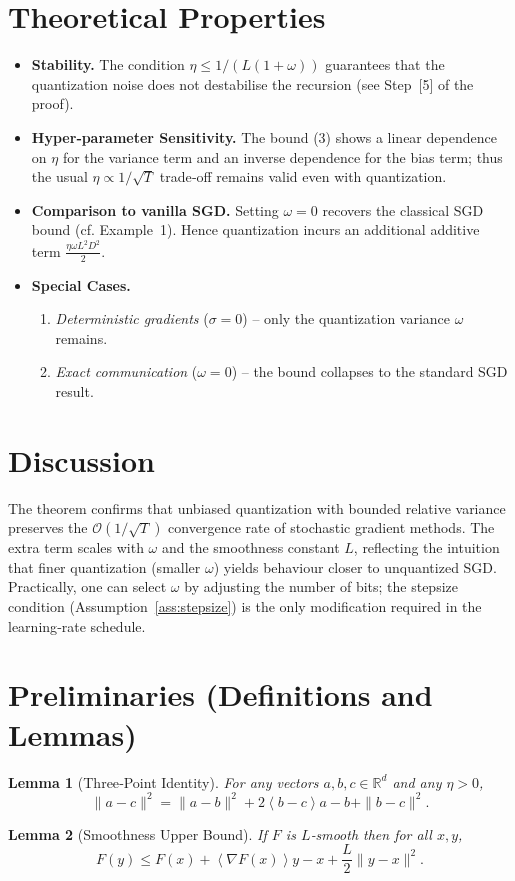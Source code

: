 \documentclass{article}
\newtheorem{lemma}{Lemma}
\newcommand{\RR}{\mathbb{R}}
\newcommand{\inner}[1]{\left\langle #1 \right\rangle}
\begin{document}
\section*{Theoretical Properties}
\begin{itemize}
\item \textbf{Stability.} The condition $\eta\le 1/(L(1+\omega))$ guarantees that the quantization noise does not destabilise the recursion (see Step~[5] of the proof).
\item \textbf{Hyper‑parameter Sensitivity.} The bound (3) shows a linear dependence on $\eta$ for the variance term and an inverse dependence for the bias term; thus the usual $\eta\propto 1/\sqrt{T}$ trade‑off remains valid even with quantization.
\item \textbf{Comparison to vanilla SGD.} Setting $\omega=0$ recovers the classical SGD bound (cf. Example 1). Hence quantization incurs an additional additive term $\frac{\eta\omega L^{2}D^{2}}{2}$.
\item \textbf{Special Cases.}
\begin{enumerate}
\item \emph{Deterministic gradients} ($\sigma=0$) – only the quantization variance $\omega$ remains.
\item \emph{Exact communication} ($\omega=0$) – the bound collapses to the standard SGD result.
\end{enumerate}
\end{itemize}

\section*{Discussion}
The theorem confirms that unbiased quantization with bounded relative variance preserves the $\mathcal{O}(1/\sqrt{T})$ convergence rate of stochastic gradient methods. The extra term scales with $\omega$ and the smoothness constant $L$, reflecting the intuition that finer quantization (smaller $\omega$) yields behaviour closer to unquantized SGD. Practically, one can select $\omega$ by adjusting the number of bits; the stepsize condition (Assumption~\ref{ass:stepsize}) is the only modification required in the learning‑rate schedule.

\newpage
\section*{Preliminaries (Definitions and Lemmas)}
\begin{lemma}[Three‑Point Identity]\label{lem:three}
For any vectors $a,b,c\in\RR^{d}$ and any $\eta>0$,
\[
\|a-c\|^{2}= \|a-b\|^{2}+2\inner{b-c}{a-b}+\|b-c\|^{2}.
\]
\end{lemma}
\begin{lemma}[Smoothness Upper Bound]\label{lem:smooth}
If $F$ is $L$‑smooth then for all $x,y$,
\[
F(y)\le F(x)+\inner{\nabla F(x)}{y-x}+\frac{L}{2}\|y-x\|^{2}.
\]
\end{lemma}
\end{document}
